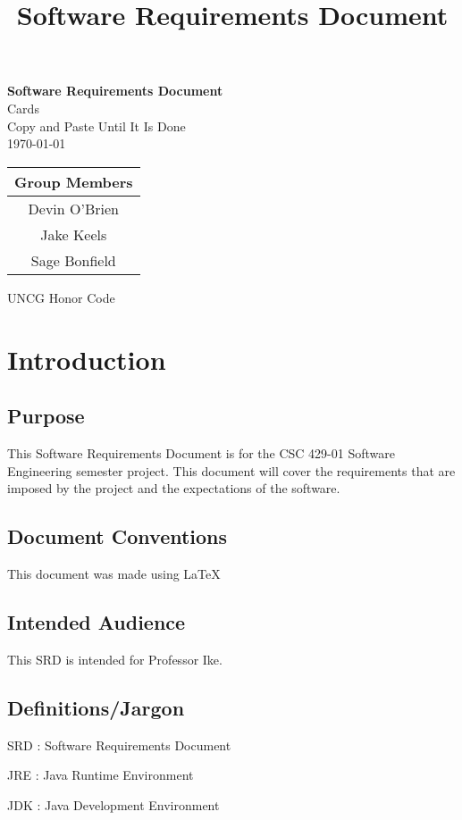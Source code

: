 \documentclass[12pt]{article}
\title{Software Requirements Document}
\begin{document}
\begin{titlepage}
\begin{center}
\Huge
\textbf{Software Requirements Document}\\
\huge Cards\\
\Large
Copy and Paste Until It Is Done\\
\Large \today\\
\begin{tabular}{|c|}
\hline
Group Members\\
\hline
Devin O'Brien\\
Jake Keels\\
Sage Bonfield\\
\hline
\end{tabular}
\large UNCG Honor Code
\end{center}
\end{titlepage}
\section{Introduction}\label{introduction}

\tableofcontents

\newpage
\subsection{Purpose}

This Software Requirements Document is for the CSC 429-01 Software
Engineering semester project. This document will cover the requirements
that are imposed by the project and the expectations of the software.


\subsection{Document Conventions}
This document was made using \LaTeX

\subsection{Intended Audience}
This SRD is intended for Professor Ike. 

\subsection{Definitions/Jargon}
SRD : Software Requirements Document

JRE : Java Runtime Environment

JDK : Java Development Environment
\end{document}
